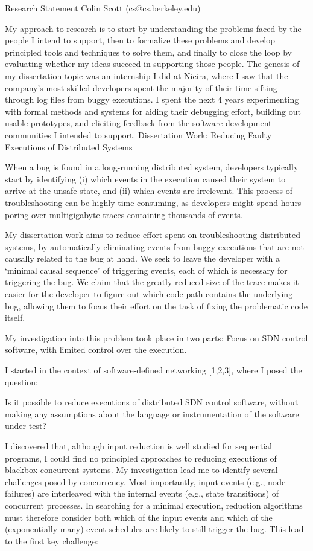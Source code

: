 Research Statement
Colin Scott (cs@cs.berkeley.edu)

My approach to research is to start by understanding the problems faced by the people I intend to support, then to formalize these problems and develop principled tools and techniques to solve them, and finally to close the loop by evaluating whether my ideas succeed in supporting those people. The genesis of my dissertation topic was an internship I did at Nicira, where I saw that the company’s most skilled developers spent the majority of their time sifting through log files from buggy executions. I spent the next 4 years experimenting with formal methods and systems for aiding their debugging effort, building out usable prototypes, and eliciting feedback from the software development communities I intended to support.
Dissertation Work: Reducing Faulty Executions of Distributed Systems

When a bug is found in a long-running distributed system, developers typically start by identifying (i) which events in the execution caused their system to arrive at the unsafe state, and (ii) which events are irrelevant. This process of troubleshooting can be highly time-consuming, as developers might spend hours poring over multigigabyte traces containing thousands of events.

My dissertation work aims to reduce effort spent on troubleshooting
distributed systems, by automatically eliminating events from buggy executions
that are not causally related to the bug at hand. We seek to leave the developer with a `minimal causal sequence' of triggering events, each of which is necessary for triggering the bug. We claim that the greatly reduced size of the trace makes it easier for the developer to figure out which code path contains the underlying bug, allowing them to focus their effort on the task of fixing the problematic code itself.

My investigation into this problem took place in two parts:
Focus on SDN control software, with limited control over the execution.

I started in the context of software-defined networking [1,2,3], where I posed the question:

Is it possible to reduce executions of distributed SDN control software, without making any assumptions about the language or instrumentation of the software under test?

I discovered that, although input reduction is well studied for sequential
programs, I could find no principled approaches to reducing executions of
blackbox concurrent systems. My investigation lead me to identify several
challenges posed by concurrency. Most importantly, input events (e.g., node
failures) are interleaved with the internal events (e.g., state transitions)
of concurrent processes. In searching for a minimal execution, reduction algorithms must therefore consider both which of the input events and which of the (exponentially many) event schedules are likely to still trigger the bug. This lead to the first key challenge: 

